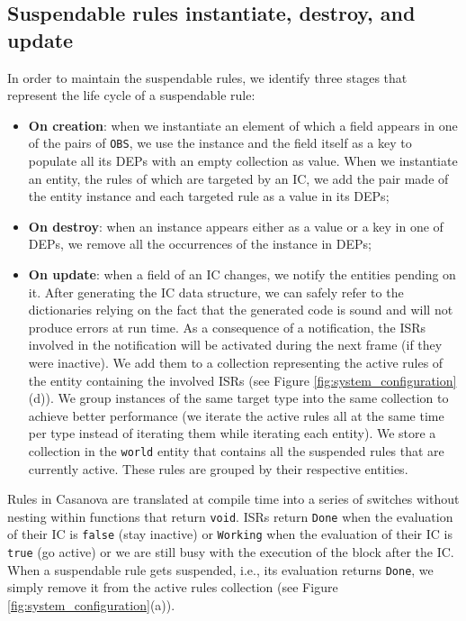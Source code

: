 \subsection{Suspendable rules instantiate, destroy, and update}

In order to maintain the suspendable rules, we identify three stages that represent the life cycle of a suspendable rule:

\begin{itemize}
\item \textbf{On creation}: when we instantiate an element of which a field appears in one of the pairs of \texttt{OBS}, we use the instance and the field itself as a key to populate all its DEPs with an empty collection as value. When we instantiate an entity, the rules of which are targeted by an IC, we add the pair made of the entity instance and each targeted rule as a value in its DEPs;
\item \textbf{On destroy}: when an instance appears either as a value or a key in one of DEPs, we remove all the occurrences of the instance in DEPs;
\item \textbf{On update}: when a field of an IC changes, we notify the entities pending on it. After generating the IC data structure, we can safely refer to the dictionaries relying on the fact that the generated code is sound and will not produce errors at run time. As a consequence of a notification, the ISRs involved in the notification will be activated during the next frame (if they were inactive). We add them to a collection representing the active rules of the entity containing the involved ISRs (see Figure \ref{fig:system_configuration}(d)). We group instances of the same target type into the same collection to achieve better performance (we iterate the active rules all at the same time per type instead of iterating them while iterating each entity). We store a collection in the \texttt{world} entity that contains all the suspended rules that are currently active. These rules are grouped by their respective entities.
\end{itemize}


Rules in Casanova are translated at compile time into a series of switches without nesting within functions that return \texttt{void}. ISRs return \texttt{Done} when the evaluation of their IC is \texttt{false} (stay inactive) or \texttt{Working} when the evaluation of their IC is \texttt{true} (go active) or we are still busy with the execution of the block after the IC. When a suspendable rule gets suspended, i.e., its evaluation returns \texttt{Done}, we simply remove it from the active rules collection (see Figure \ref{fig:system_configuration}(a)).

